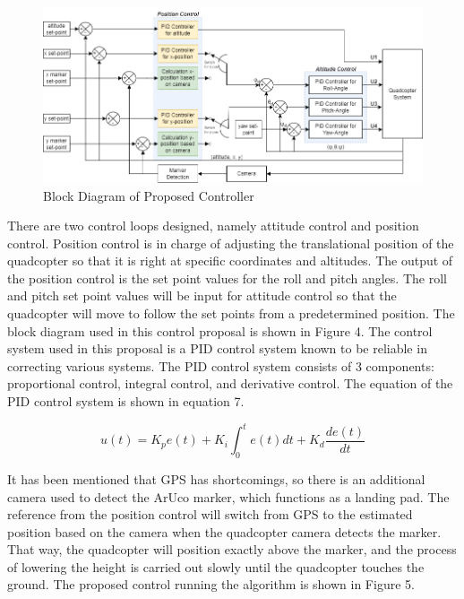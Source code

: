 \documentclass[a4paper]{jpconf}
\begin{document}
\begin{figure}[h]
    \centering
    \includegraphics[width=30pc]{block-diagram-controller.png}
    \caption{\label{label}Block Diagram of Proposed Controller}
\end{figure}

There are two control loops designed, namely attitude control and position control. Position control is in charge of adjusting the translational position of the quadcopter so that it is right at specific coordinates and altitudes. The output of the position control is the set point values for the roll and pitch angles. The roll and pitch set point values will be input for attitude control so that the quadcopter will move to follow the set points from a predetermined position. The block diagram used in this control proposal is shown in Figure 4. The control system used in this proposal is a PID control system known to be reliable in correcting various systems. The PID control system consists of 3 components: proportional control, integral control, and derivative control. The equation of the PID control system is shown in equation 7.

\begin{equation}
    u(t)=K_{p}e(t)+K_{i}\int_{0}^{t}e(t)dt+K_{d}\frac{de(t)}{dt}
\end{equation}

It has been mentioned that GPS has shortcomings, so there is an additional camera used to detect the ArUco marker, which functions as a landing pad. The reference from the position control will switch from GPS to the estimated position based on the camera when the quadcopter camera detects the marker. That way, the quadcopter will position exactly above the marker, and the process of lowering the height is carried out slowly until the quadcopter touches the ground. The proposed control running the algorithm is shown in Figure 5.
\end{document}
